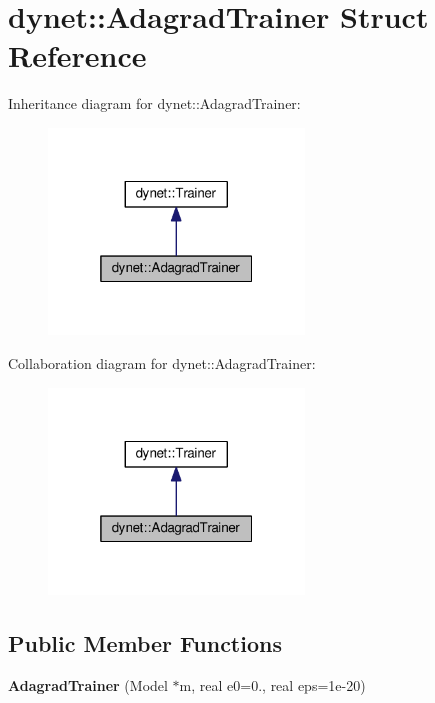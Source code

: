 \hypertarget{structdynet_1_1AdagradTrainer}{}\section{dynet\+:\+:Adagrad\+Trainer Struct Reference}
\label{structdynet_1_1AdagradTrainer}


Inheritance diagram for dynet\+:\+:Adagrad\+Trainer\+:\nopagebreak
\begin{figure}[H]
\begin{center}
\leavevmode
\includegraphics[width=193pt]{structdynet_1_1AdagradTrainer__inherit__graph}
\end{center}
\end{figure}


Collaboration diagram for dynet\+:\+:Adagrad\+Trainer\+:\nopagebreak
\begin{figure}[H]
\begin{center}
\leavevmode
\includegraphics[width=193pt]{structdynet_1_1AdagradTrainer__coll__graph}
\end{center}
\end{figure}
\subsection*{Public Member Functions}
\begin{DoxyCompactItemize}
\item 
\hypertarget{structdynet_1_1AdagradTrainer_a5e4c3a6215a907fe324b91d44be79f65}{}{\bfseries Adagrad\+Trainer} (Model $\ast$m, real e0=0., real eps=1e-\/20)\label{structdynet_1_1AdagradTrainer_a5e4c3a6215a907fe324b91d44be79f65}

\end{DoxyCompactItemize}
